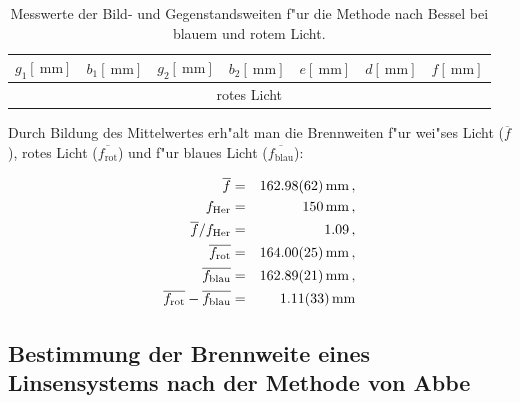 		\begin{table}[!h]
			\begin{center}
				\label{tabelle:farbe}
				\caption{Messwerte der Bild- und Gegenstandsweiten f"ur die Methode nach Bessel bei blauem und rotem Licht.}
				\begin{tabular}{|c|c|c|c|c|c|c|}
					\hline 
					$g_1 [\SI{}{\milli \meter}]$ & $b_1 [\SI{}{\milli \meter}]$ & $g_2 [\SI{}{\milli \meter}]$ & $b_2 [\SI{}{\milli \meter}]$ & $e [\SI{}{\milli \meter}]$ & $d [\SI{}{\milli \meter}]$ & $f [\SI{}{\milli \meter}]$ \\
					\hline 
					\hline
					\multicolumn{7}{|c|}{rotes Licht}\\
					\hline
					
					\hline 
				\end{tabular}
			\end{center}
		\end{table}

		\clearpage

		Durch Bildung des Mittelwertes erh"alt man die Brennweiten f"ur wei"ses Licht ($\overline{f}$),
		rotes Licht ($\overline{f_\mathrm{rot}}$) und f"ur blaues Licht ($\overline{f_\mathrm{blau}}$):

		\begin{eqnarray*}
			\overline{f} & = & \SI{162.98 (62)}{\milli \meter} \, , \\
			f_\mathrm{Her} & = & \SI{150}{\milli \meter} \, , \\
			\overline{f}/f_\mathrm{Her} & = & \SI{1.09}{} \, , \\
			\overline{f_\mathrm{rot}} & = & \SI{164.00 (25)}{\milli \meter} \, , \\
			\overline{f_\mathrm{blau}} & = & \SI{162.89 (21)}{\milli \meter} \, , \\
			\overline{f_\mathrm{rot}} - \overline{f_\mathrm{blau}} & = & \SI{1.11 (33)}{\milli \meter}
		\end{eqnarray*}

	\subsection{Bestimmung der Brennweite eines Linsensystems nach der Methode von Abbe}
		\label{subsec:abbe}

